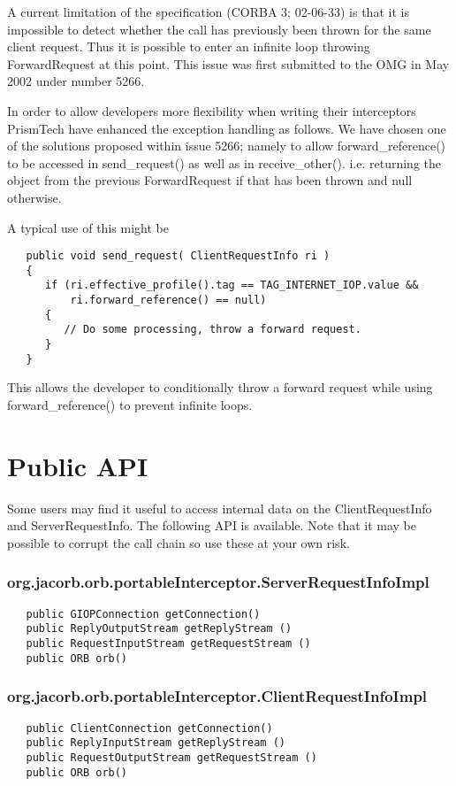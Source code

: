 A current limitation of the specification (CORBA 3; 02-06-33) is that it is
impossible to detect whether the call has previously been thrown for the same
client request. Thus it is possible to enter an infinite loop throwing
ForwardRequest at this point. This issue was first submitted to the OMG in
May 2002 under number 5266.

In order to allow developers more flexibility when writing their interceptors
PrismTech have enhanced the exception handling as follows. We have chosen one of
the solutions proposed within issue 5266; namely to allow forward\_reference()
to be accessed in send\_request() as well as in receive\_other(). i.e. returning
the object from the previous ForwardRequest if that has been thrown and null
otherwise.

A typical use of this might be
\begin{verbatim}
   public void send_request( ClientRequestInfo ri )
   {
      if (ri.effective_profile().tag == TAG_INTERNET_IOP.value &&
          ri.forward_reference() == null)
      {
         // Do some processing, throw a forward request.
      }
   }
\end{verbatim}
This allows the developer to conditionally throw a forward request while using
forward\_reference() to prevent infinite loops.

\section{Public API}
Some users may find it useful to access internal data on the ClientRequestInfo and ServerRequestInfo. The following API is available. Note that it may be possible to corrupt the call chain so use these at your own risk.

\subsubsection{org.jacorb.orb.portableInterceptor.ServerRequestInfoImpl}
\begin{verbatim}
   public GIOPConnection getConnection()
   public ReplyOutputStream getReplyStream ()
   public RequestInputStream getRequestStream ()
   public ORB orb()
\end{verbatim}

\subsubsection{org.jacorb.orb.portableInterceptor.ClientRequestInfoImpl}
\begin{verbatim}
   public ClientConnection getConnection()
   public ReplyInputStream getReplyStream ()
   public RequestOutputStream getRequestStream ()
   public ORB orb()
\end{verbatim}


